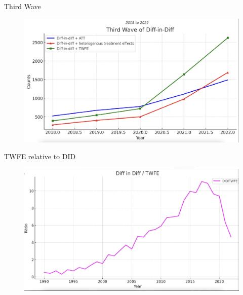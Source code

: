 \documentclass{beamer}
\begin{document}
\begin{frame}{Third Wave}

	\begin{figure}
	\includegraphics[scale=0.15]{./lecture_includes/wave3}
	\end{figure}

\end{frame}

\begin{frame}{TWFE relative to DID}

	\begin{figure}
	\includegraphics[scale=0.15]{./lecture_includes/wave4}
	\end{figure}

\end{frame}
\end{document}
